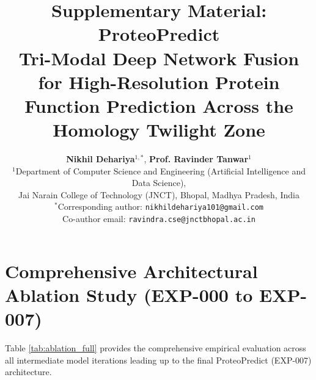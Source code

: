 \documentclass[10pt]{article}
\title{\textbf{\Large Supplementary Material: ProteoPredict\\Tri-Modal Deep Network Fusion for High-Resolution Protein Function Prediction Across the Homology Twilight Zone}}
\author{
    \textbf{Nikhil Dehariya}$^{1,*}$, \textbf{Prof. Ravinder Tanwar}$^{1}$ \\
    $^{1}$Department of Computer Science and Engineering (Artificial Intelligence and Data Science), \\
    Jai Narain College of Technology (JNCT), Bhopal, Madhya Pradesh, India \\
    $^{*}$Corresponding author: \texttt{nikhildehariya101@gmail.com} \\
    Co-author email: \texttt{ravindra.cse@jnctbhopal.ac.in}
}
\date{}
\begin{document}
\maketitle

\setcounter{table}{0}
\renewcommand{\thetable}{S\arabic{table}}
\setcounter{figure}{0}
\renewcommand{\thefigure}{S\arabic{figure}}
\setcounter{section}{0}
\renewcommand{\thesection}{S\arabic{section}}

\section{Comprehensive Architectural Ablation Study (EXP-000 to EXP-007)}

Table \ref{tab:ablation_full} provides the comprehensive empirical evaluation across all intermediate model iterations leading up to the final ProteoPredict (EXP-007) architecture.
\end{document}
